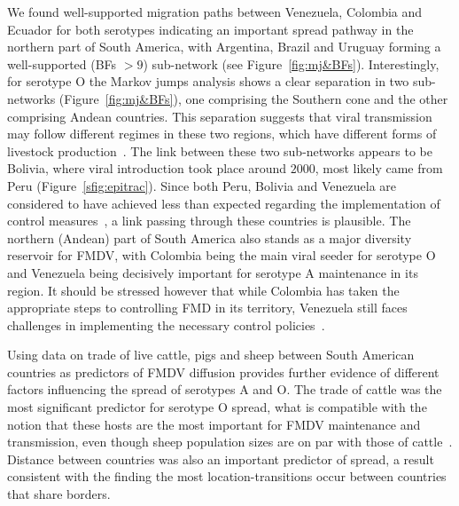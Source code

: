 \documentclass[10pt]{article}
\begin{document}
We found well-supported migration paths between Venezuela, Colombia and Ecuador for both serotypes indicating an important spread pathway in the northern part of South America, with Argentina, Brazil and Uruguay forming a well-supported (BFs $> 9$) sub-network (see Figure~\ref{fig:mj&BFs}).
Interestingly, for serotype O the Markov jumps analysis shows a clear separation in two sub-networks (Figure~\ref{fig:mj&BFs}), one comprising the Southern cone and the other comprising Andean countries.
This separation suggests that viral transmission may follow different regimes in these two regions, which have different forms of livestock production~\cite{Saraiva2003,Naranjo2013}.
The link between these two sub-networks appears to be Bolivia, where viral introduction took place around $2000$, most likely came from Peru (Figure~\ref{sfig:epitrac}). 
Since both Peru, Bolivia and Venezuela are considered to have achieved less than expected regarding the implementation of control measures~\cite{Naranjo2013}, a link passing through these countries is plausible.
The northern (Andean) part of South America also stands as a major diversity reservoir for FMDV, with Colombia being the main viral seeder for serotype O and Venezuela being decisively important for serotype A maintenance in its region.
It should be stressed however that while Colombia has taken the appropriate steps to controlling FMD in its territory, Venezuela still faces challenges in implementing the necessary control policies~\cite{Naranjo2013}.

Using data on trade of live cattle, pigs and sheep between South American countries as predictors of FMDV diffusion provides further evidence of different factors influencing the spread of serotypes A and O.
The trade of cattle was the most significant predictor for serotype O spread, what is compatible with the notion that these hosts are the most important for FMDV maintenance and transmission, even though sheep population sizes are on par with those of cattle~\cite{Saraiva2003}.
Distance between countries was also an important predictor of spread, a result consistent with the finding the most location-transitions occur between countries that share borders.
\end{document}
